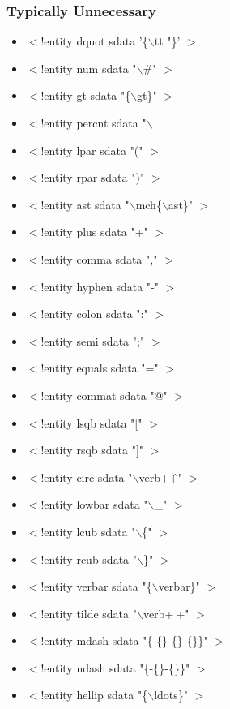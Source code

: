 \subsubsection{Typically Unnecessary}
\begin{itemize}
\item
$<$!entity dquot sdata '\{$\backslash$tt "\}' $>$
\item
$<$!entity num sdata "$\backslash$\#" $>$
\item
$<$!entity gt sdata "\{$\backslash$gt\}" $>$
\item
$<$!entity percnt sdata "$\backslash$%
\item
$<$!entity lpar sdata "(" $>$
\item
$<$!entity rpar sdata ")" $>$
\item
$<$!entity ast sdata "$\backslash$mch\{$\backslash$ast\}" $>$
\item
$<$!entity plus sdata "+" $>$
\item
$<$!entity comma sdata "," $>$
\item
$<$!entity hyphen sdata "-" $>$
\item
$<$!entity colon sdata ":" $>$
\item
$<$!entity semi sdata ";" $>$
\item
$<$!entity equals sdata "=" $>$
\item
$<$!entity commat sdata "@" $>$
\item
$<$!entity lsqb sdata "[" $>$
\item
$<$!entity rsqb sdata "]" $>$
\item
$<$!entity circ sdata "$\backslash$verb+\^+" $>$
\item
$<$!entity lowbar sdata "$\backslash$\_" $>$
\item
$<$!entity lcub sdata "$\backslash$\{" $>$
\item
$<$!entity rcub sdata "$\backslash$\}" $>$
\item
$<$!entity verbar sdata "\{$\backslash$verbar\}" $>$
\item
$<$!entity tilde sdata "$\backslash$verb+$~$+" $>$
\item
$<$!entity mdash sdata "\{-\{\}-\{\}-\{\}\}" $>$
\item
$<$!entity ndash sdata "\{-\{\}-\{\}\}" $>$
\item
$<$!entity hellip sdata "\{$\backslash$ldots\}" $>$
\end{itemize}

